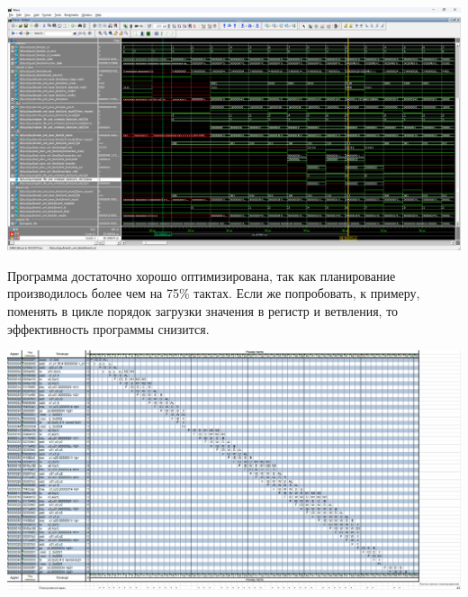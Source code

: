 \begin{center}
\centering 
\includegraphics[scale=0.25]{images/05-execute.png}
\end{center}

Программа достаточно хорошо оптимизирована, так как планирование производилось более чем на 75\% тактах. Если же попробовать, к примеру, поменять в цикле порядок загрузки значения в регистр и ветвления, то эффективность программы снизится.

\begin{center}
\centering 
\includegraphics[scale=0.35]{images/05-route.png}
\end{center}